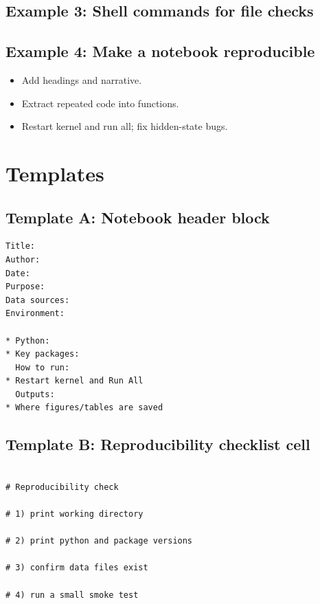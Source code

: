 \subsection{Example 3: Shell commands for file checks}

\subsection{Example 4: Make a notebook reproducible}
\begin{itemize}
\item Add headings and narrative.
\item Extract repeated code into functions.
\item Restart kernel and run all; fix hidden-state bugs.
\end{itemize}

\section{Templates}
\subsection{Template A: Notebook header block}
\begin{verbatim}
Title:
Author:
Date:
Purpose:
Data sources:
Environment:

* Python:
* Key packages:
  How to run:
* Restart kernel and Run All
  Outputs:
* Where figures/tables are saved
  \end{verbatim}

\subsection{Template B: Reproducibility checklist cell}
\begin{verbatim}

# Reproducibility check

# 1) print working directory

# 2) print python and package versions

# 3) confirm data files exist

# 4) run a small smoke test

\end{verbatim}

